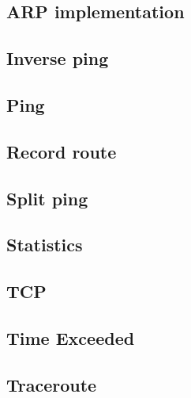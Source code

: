 \subsection{ARP implementation}

\clearpage
\subsection{Inverse ping}

\clearpage
\subsection{Ping}

\clearpage
\subsection{Record route}

\clearpage
\subsection{Split ping}

\clearpage
\subsection{Statistics}

\clearpage
\subsection{TCP}

\clearpage
\subsection{Time Exceeded}

\clearpage
\subsection{Traceroute}

\clearpage
